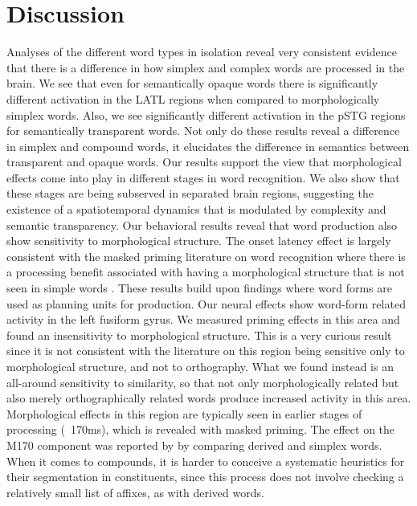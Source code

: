 \documentclass{frontiersSCNS}
\begin{document}
\section{Discussion}
	Analyses of the different word types in isolation reveal very consistent evidence that there is a difference in how simplex and complex words are processed in the brain. We see that even for semantically opaque words there is significantly different activation in the LATL regions when compared to morphologically simplex words. Also, we see significantly different activation in the pSTG regions for semantically transparent words. Not only do these results reveal a difference in simplex and compound words, it elucidates the difference in semantics between transparent and opaque words. Our results support the view that morphological effects come into play in different stages in word recognition.  We also show that these stages are being subserved in separated brain regions, suggesting the existence of a spatiotemporal dynamics that is modulated by complexity and semantic transparency. 	
 Our behavioral results reveal that word production also show sensitivity to morphological structure.  The onset latency effect is largely consistent with the masked priming literature on word recognition where there is a processing benefit associated with having a morphological structure that is not seen in simple words \citep{Rastle:2004, Taft:2004, Morris:2007, McCormick:2008, Fiorentino:2009}. These results build upon \cite{Roelofs:2002} findings where word forms are used as planning units for production.  
Our neural effects show word-form related activity in the left fusiform gyrus.  We measured priming effects in this area and found an insensitivity to morphological structure. This is a very curious result since it is not consistent with the literature on this region being sensitive only to morphological structure, and not to orthography. What we found instead is an all-around sensitivity to similarity, so that not only morphologically related but also merely orthographically related words produce increased activity in this area.  Morphological effects in this region are typically seen in earlier stages of processing (~170ms), which is revealed with masked priming.   The effect on the M170 component was reported by \cite{Zweig:2009} by comparing derived and simplex words.  When it comes to compounds, it is harder to conceive a systematic heuristics for their segmentation in constituents, since this process does not involve checking a relatively small list of affixes, as with derived words.
\end{document}
